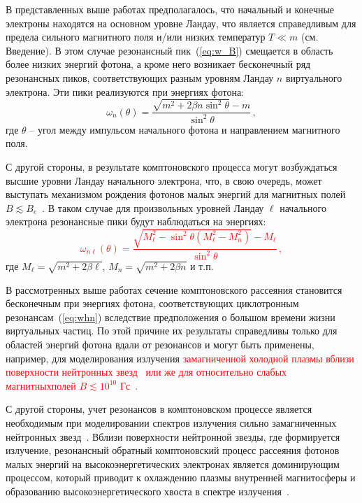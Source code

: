 В представленных выше работах предполагалось, что начальный и конечные электроны находятся 
на основном уровне Ландау, что является справедливым для предела сильного магнитного поля 
и/или низких температур $T\ll m$ (см. Введение). В этом случае резонансный 
пик~(\ref{eq:w_B})  смещается в область более низких энергий фотона, а кроме 
него возникает бесконечный ряд резонансных пиков, соответствующих разным 
уровням Ландау $n$ 
виртуального электрона. Эти пики реализуются при энергиях фотона:
\begin{equation}\label{eq:whn}
	\omega_n(\theta)= \frac{\sqrt{m^2+2 \beta n \sin^2\theta} - 
		m}{\sin^2\theta}\, ,
\end{equation}
где $\theta$ -- угол между импульсом начального фотона и направлением 
магнитного поля. 

С другой стороны, в результате комптоновского процесса могут возбуждаться 
высшие уровни Ландау начального электрона, что, в свою очередь, может выступать 
механизмом рождения фотонов малых энергий для магнитных полей $B\lesssim 
B_e$~\cite{Daugherty:1986,Bussard:1986}. В таком случае для произвольных уровней Ландау $\ell$ начального электрона резонансные 
пики будут наблюдаться на энергиях:
\textcolor{red}{
\begin{equation}\label{eq:resAll}
	\omega_{n\ell}(\theta)=\frac{\sqrt{M_\ell^2 - \sin^2\theta (M_\ell^2-M_n^2)}-M_\ell}{\sin^2\theta}\, ,
\end{equation}}
где $M_\ell=\sqrt{m^2+2\beta \ell}$, $M_n=\sqrt{m^2+2\beta n}$ и т.п.

В рассмотренных выше работах сечение комптоновского рассеяния 
становится бесконечным при энергиях фотона, соответствующих циклотронным 
резонансам~(\ref{eq:whn}) вследствие предположения о 
большом времени жизни виртуальных частиц. По этой причине их результаты 
справедливы только для областей энергий фотона вдали от резонансов
и могут быть применены, например, для моделирования излучения 
	\textcolor{red}{замагниченной 
	холодной плазмы вблизи поверхности нейтронных 
	звезд~\cite{Ozel:2001} или же для относительно слабых магнитных\linebreak полей $B\lesssim 10^{10}$ Гс~\cite{Zavlin:1996}.}

С другой стороны, учет резонансов в комптоновском процессе является необходимым 
при моделировании спектров излучения сильно замагниченных нейтронных 
звезд~\cite{Alexander:1991,Araya:1999,Ho:2001,Lyutikov:2006,Potekhin:2004,Schonherr:2007,Nishimura:2008,Suleimanov:2009}.
Вблизи поверхности нейтронной звезды, где формируется излучение, резонансный 
обратный комптоновский процесс рассеяния фотонов малых энергий на высокоэнергетических электронах 
является доминирующим процессом, который приводит к охлаждению плазмы 
внутренней магнитосферы и образованию высокоэнергетического хвоста в спектре 
излучения~\cite{Fernandez:2007,Nobili:2008,Baring:2018,Beloborodov:2013}.
%

